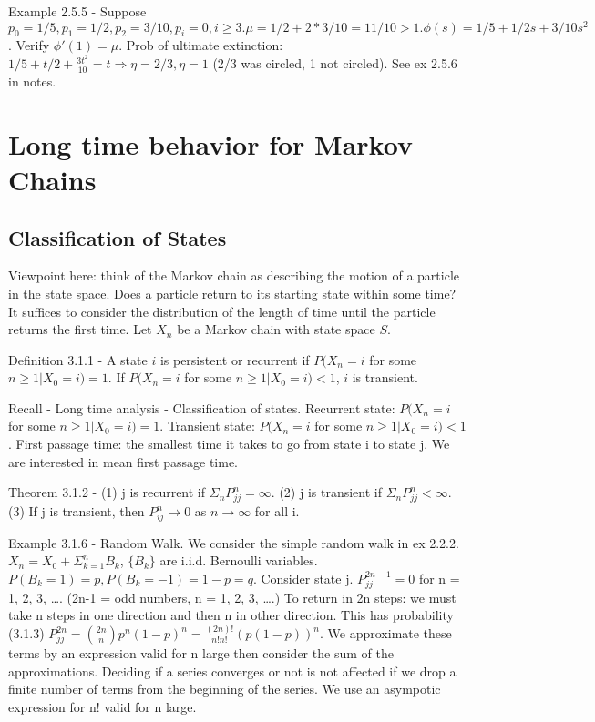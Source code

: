 \documentclass{article}
\begin{document}
Example 2.5.5 - Suppose $p_0 = 1/5, p_1 = 1/2, p_2 = 3/10, p_i = 0, i \ge 3. \mu = 1/2 + 2 * 3/10 = 11/10 > 1. \phi(s) = 1/5 + 1/2 s + 3/10 s^2$. Verify $\phi'(1) = \mu$. Prob of ultimate extinction: $1/5 + t/2 + \frac{3t^2}{10} = t \Rightarrow \eta = 2/3, \eta = 1$ (2/3 was circled, 1 not circled). See ex 2.5.6 in notes.

\section{Long time behavior for Markov Chains}

\subsection{Classification of States}

Viewpoint here: think of the Markov chain as describing the motion of a particle in the state space. Does a particle return to its starting state within some time? It suffices to consider the distribution of the length of time until the particle returns the first time. Let $X_n$ be a Markov chain with state space $S$.

Definition 3.1.1 - A state $i$ is persistent or recurrent if $P(X_n=i $ for some $ n \ge 1| X_0=i)=1$. If $P(X_n=i $ for some $ n\ge 1|X_0=i) < 1$, $i$ is transient.

Recall - Long time analysis - Classification of states. Recurrent state: $P(X_n=i$ for some $n \ge 1|X_0=i)=1$. Transient state: $P(X_n=i$ for some $n \ge 1|X_0=i)<1$. First passage time: the smallest time it takes to go from state i to state j. We are interested in mean first passage time.

Theorem 3.1.2 - (1) j is recurrent if $\Sigma_n P_{jj}^n = \infty$. (2) j is transient if $\Sigma_n P_{jj}^n < \infty$. (3) If j is transient, then $P_{ij}^n \rightarrow 0$ as $n \rightarrow \infty$ for all i.

Example 3.1.6 - Random Walk. We consider the simple random walk in ex 2.2.2. $X_n = X_0 + \Sigma_{k=1}^n B_k$, $\{B_k\}$ are i.i.d. Bernoulli variables. $P(B_k=1)=p, P(B_k=-1) = 1-p = q$. Consider state j. $P_{jj}^{2n-1} = 0$ for n = 1, 2, 3, \dots. (2n-1 = odd numbers, n = 1, 2, 3, \dots.) To return in 2n steps: we must take n steps in one direction and then n in other direction. This has probability (3.1.3) $P_{jj}^{2n} = \binom{2n}{n} p^n(1-p)^n = \frac{(2n)!}{n!n!}(p(1-p))^n$. We approximate these terms by an expression valid for n large then consider the sum of the approximations. Deciding if a series converges or not is not affected if we drop a finite number of terms from the beginning of the series. We use an asympotic expression for n! valid for n large.
\end{document}
